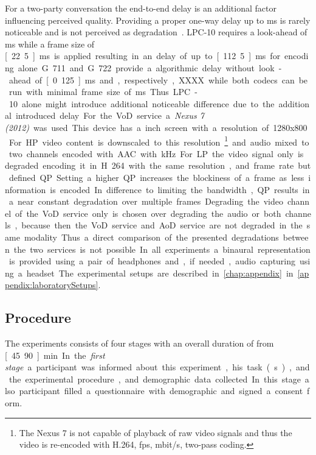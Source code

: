 For a two-party conversation the end-to-end delay is an additional factor influencing perceived quality.
Providing a proper one-way delay up to \unit[100]{ms} is rarely noticeable and is not perceived as degradation~\citep[\cf,][p. 9]{itu-t_g.107:_2005}.
LPC-10 requires a look-ahead of \unit[90]{ms} while a frame size of \unit[22.5]{ms} is applied resulting in an delay of up to \unit[112.5]{ms} for encoding alone.
G.711 and G.722 provide a algorithmic delay without look-ahead of \unit[0.125]{ms} and, respectively, XXXX while both codecs can be run with minimal frame size of \unit[10]{ms}. %
Thus LPC-10 alone might introduce additional noticeable difference due to the additional introduced delay.

For the \ac{VoD} service a \emph{Nexus 7 (2012)} was used.
This device has a \unit[7]{inch} screen with a resolution of 1280x800.
For \ac{HP} video content is downscaled to this resolution\footnote{The Nexus 7 is not capable of playback of raw video signals and thus the video is re-encoded with H.264, \unit[25]{\ac{fps}}, \unit[5]{mbit/s}, two-pass coding.} and audio mixed to two channels encoded with \ac{AAC} with \unit[48]{kHz}.
For \ac{LP} the video signal only is degraded encoding it in H.264 with the same resolution, and frame rate but defined \ac{QP}.
Setting a higher \ac{QP} increases the blockiness of a frame as less information is encoded.
In difference to limiting the bandwidth, \ac{QP} results in a near constant degradation over multiple frames.  %
Degrading the video channel of the \ac{VoD} service only is chosen over degrading the audio or both channels, because then the \ac{VoD} service and \ac{AoD} service are not degraded in the same modality.
Thus a direct comparison of the presented degradations between the two services is not possible.

In all experiments a binaural representation is provided using a pair of headphones and, if needed, audio capturing using a headset.
The experimental setups are described in \autoref{chap:appendix} in \autoref{appendix:laboratorySetups}.

\subsection{Procedure} %
The experiments consists of four stages with an overall duration of from \unit[45...90]{min}.
In the \emph{first stage} a participant was informed about this experiment, his task(s), and the experimental procedure, and demographic data collected.
In this stage also participant filled a questionnaire with demographic and signed a consent form.


